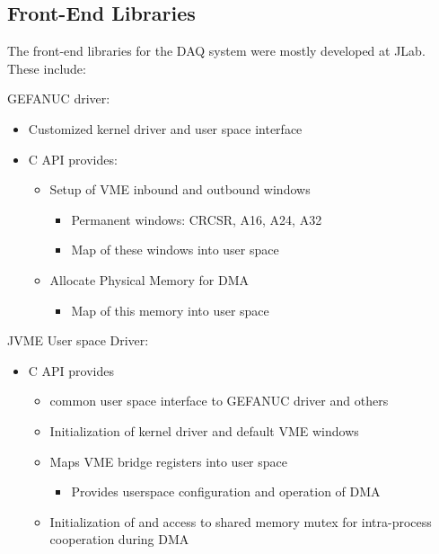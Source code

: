 \subsection{Front-End Libraries}

The front-end libraries for the DAQ system were mostly developed at JLab. These include:

GEFANUC driver:
\begin{itemize}
\item Customized kernel driver and user space interface
\item C API provides:
   \begin{itemize}
   \item Setup of VME inbound and outbound windows
      \begin{itemize}
      \item Permanent windows: CRCSR, A16, A24, A32
      \item Map of these windows into user space
      \end{itemize}
   \item Allocate Physical Memory for DMA
      \begin{itemize}
      \item Map of this memory into user space
      \end{itemize}
   \end{itemize}
\end{itemize}

JVME User space Driver:
\begin{itemize}
\item C API provides
  \begin{itemize}
  \item common user space interface to GEFANUC driver and others
  \item Initialization of kernel driver and default VME windows
  \item Maps VME bridge registers into user space
    \begin{itemize}
    \item Provides userspace configuration and operation of DMA
    \end{itemize}
  \item Initialization of and access to shared memory mutex for intra-process cooperation during DMA
  \end{itemize}
\end{itemize}


